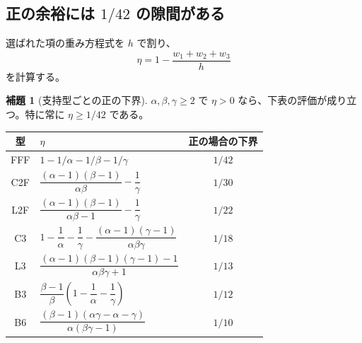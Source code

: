 \documentclass[11pt,a4paper]{ltjsarticle}
\numberwithin{equation}{section}
\theoremstyle{definition}
\newtheorem{lemma}[theorem]{補題}
\begin{document}
\subsection{正の余裕には \texorpdfstring{$1/42$}{1/42} の隙間がある}
選ばれた項の重み方程式を $h$ で割り、
\[
 \eta=1-\frac{w_1+w_2+w_3}{h}
\]
を計算する。
\begin{lemma}[支持型ごとの正の下界]\label{lem:gap}
$\alpha,\beta,\gamma\ge2$ で $\eta>0$ なら、下表の評価が成り立つ。特に常に $\eta\ge1/42$ である。
\begin{center}\small
\renewcommand{\arraystretch}{1.55}
\begin{tabular}{clc}
\toprule
型 & $\eta$ & 正の場合の下界\\\midrule
FFF & $1-1/\alpha-1/\beta-1/\gamma$ & $1/42$\\
C2F & $\dfrac{(\alpha-1)(\beta-1)}{\alpha\beta}-\dfrac1\gamma$ & $1/30$\\
L2F & $\dfrac{(\alpha-1)(\beta-1)}{\alpha\beta-1}-\dfrac1\gamma$ & $1/22$\\
C3 & $1-\dfrac1\alpha-\dfrac1\gamma-\dfrac{(\alpha-1)(\gamma-1)}{\alpha\beta\gamma}$ & $1/18$\\
L3 & $\dfrac{(\alpha-1)(\beta-1)(\gamma-1)-1}{\alpha\beta\gamma+1}$ & $1/13$\\
B3 & $\dfrac{\beta-1}{\beta}\left(1-\dfrac1\alpha-\dfrac1\gamma\right)$ & $1/12$\\
B6 & $\dfrac{(\beta-1)(\alpha\gamma-\alpha-\gamma)}{\alpha(\beta\gamma-1)}$ & $1/10$\\\bottomrule
\end{tabular}
\end{center}
\end{lemma}
\end{document}
